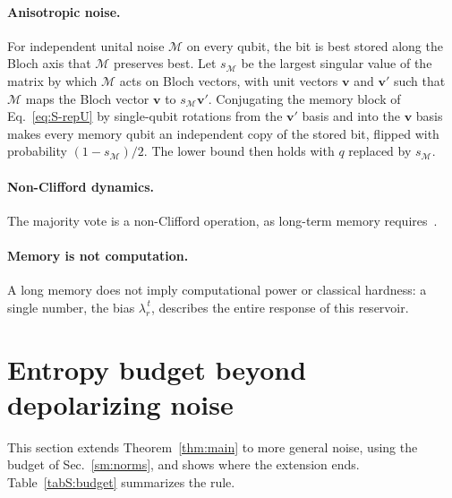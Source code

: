 \documentclass[aps,prl,twocolumn,superscriptaddress,floatfix]{revtex4-2}
\theoremstyle{plain}
\begin{document}
\paragraph*{Anisotropic noise.} For independent unital noise $\mathcal M$ on every qubit, the bit is best stored along the Bloch axis that $\mathcal M$ preserves best. Let $s_{\mathcal M}$ be the largest singular value of the matrix by which $\mathcal M$ acts on Bloch vectors, with unit vectors $\bm v$ and $\bm v'$ such that $\mathcal M$ maps the Bloch vector $\bm v$ to $s_{\mathcal M}\bm v'$. Conjugating the memory block of Eq.~\eqref{eq:S-repU} by single-qubit rotations from the $\bm v'$ basis and into the $\bm v$ basis makes every memory qubit an independent copy of the stored bit, flipped with probability $(1-s_{\mathcal M})/2$. The lower bound then holds with $q$ replaced by $s_{\mathcal M}$.

\paragraph*{Non-Clifford dynamics.} The majority vote is a non-Clifford operation, as long-term memory requires~\cite{Nelson2026}.

\paragraph*{Memory is not computation.} A long memory does not imply computational power or classical hardness: a single number, the bias $\lambda_r^{\,t}$, describes the entire response of this reservoir.

\section{Entropy budget beyond depolarizing noise}
\label{sm:budget}

This section extends Theorem~\ref{thm:main} to more general noise, using the budget of Sec.~\ref{sm:norms}, and shows where the extension ends. Table~\ref{tabS:budget} summarizes the rule.
\end{document}
